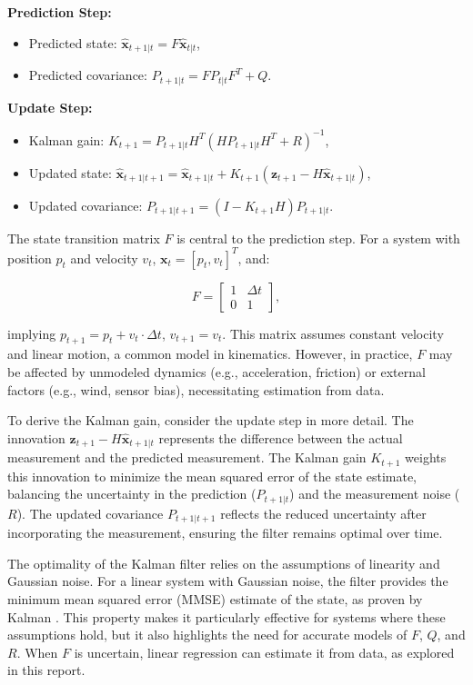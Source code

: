 \documentclass[12pt]{article}
\begin{document}
\textbf{Prediction Step:}
\begin{itemize}
    \item Predicted state: \( \hat{\mathbf{x}}_{t+1|t} = F \hat{\mathbf{x}}_{t|t} \),
    \item Predicted covariance: \( P_{t+1|t} = F P_{t|t} F^T + Q \).
\end{itemize}

\textbf{Update Step:}
\begin{itemize}
    \item Kalman gain: \( K_{t+1} = P_{t+1|t} H^T (H P_{t+1|t} H^T + R)^{-1} \),
    \item Updated state: \( \hat{\mathbf{x}}_{t+1|t+1} = \hat{\mathbf{x}}_{t+1|t} + K_{t+1} (\mathbf{z}_{t+1} - H \hat{\mathbf{x}}_{t+1|t}) \),
    \item Updated covariance: \( P_{t+1|t+1} = (I - K_{t+1} H) P_{t+1|t} \).
\end{itemize}

The state transition matrix \( F \) is central to the prediction step. For a system with position \( p_t \) and velocity \( v_t \), \( \mathbf{x}_t = [p_t, v_t]^T \), and:

\begin{equation}
    F = \begin{bmatrix} 1 & \Delta t \\ 0 & 1 \end{bmatrix},
    \label{eq:ideal_F}
\end{equation}

implying \( p_{t+1} = p_t + v_t \cdot \Delta t \), \( v_{t+1} = v_t \). This matrix assumes constant velocity and linear motion, a common model in kinematics. However, in practice, \( F \) may be affected by unmodeled dynamics (e.g., acceleration, friction) or external factors (e.g., wind, sensor bias), necessitating estimation from data.

To derive the Kalman gain, consider the update step in more detail. The innovation \( \mathbf{z}_{t+1} - H \hat{\mathbf{x}}_{t+1|t} \) represents the difference between the actual measurement and the predicted measurement. The Kalman gain \( K_{t+1} \) weights this innovation to minimize the mean squared error of the state estimate, balancing the uncertainty in the prediction (\( P_{t+1|t} \)) and the measurement noise (\( R \)). The updated covariance \( P_{t+1|t+1} \) reflects the reduced uncertainty after incorporating the measurement, ensuring the filter remains optimal over time.

The optimality of the Kalman filter relies on the assumptions of linearity and Gaussian noise. For a linear system with Gaussian noise, the filter provides the minimum mean squared error (MMSE) estimate of the state, as proven by Kalman \cite{kalman1960}. This property makes it particularly effective for systems where these assumptions hold, but it also highlights the need for accurate models of \( F \), \( Q \), and \( R \). When \( F \) is uncertain, linear regression can estimate it from data, as explored in this report.
\end{document}
